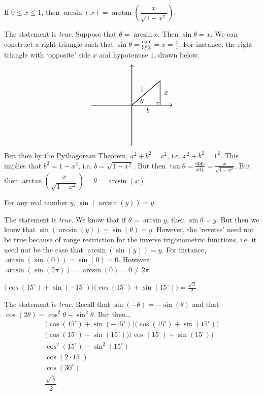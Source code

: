 \documentclass[11pt,letterpaper]{article}
\begin{document}
 If $0 \leq x \leq 1$, then $\arcsin(x)= \arctan \left( \dfrac{x}{\sqrt{1 - x^2}} \right)$. \pspace

\sol The statement is \textit{true}. Suppose that $\theta= \arcsin x$. Then $\sin \theta= x$. We can construct a right triangle such that $\sin \theta= \frac{\text{opp.}}{\text{hyp.}}= x= \frac{x}{1}$. For instance, the right triangle with `opposite' side $x$ and hypotenuse 1, drawn below. 
	\[
	\begin{tikzpicture}
	\draw[line width=0.03cm,->] (-2,0) -- (2,0);				%
	\draw[line width=0.03cm,->] (0,-2) -- (0,2);				%
	
	\node at (0.5,0.2) {$\theta$};
	\draw[line width=0.03cm] (0,0) -- (1.4,1.2) -- (1.4,0);			%
	\draw[line width=0.03cm] (1.25,0) -- (1.25,0.15) -- (1.4,0.15);	%
	
	\node at (0.8,-0.25) {$b$};
	\node at (1.7,0.6) {$x$};
	\node at (0.5,0.8) {$1$};
	\end{tikzpicture}
	\]
But then by the Pythagorean Theorem, $a^2 + b^2= c^2$, i.e. $x^2 + b^2= 1^2$. This implies that $b^2= 1 - x^2$, i.e. $b= \sqrt{1 - x^2}$. But then $\tan \theta= \frac{\text{opp.}}{\text{adj.}}= \frac{x}{\sqrt{1 - x^2}}$. But then $\arctan \left( \dfrac{x}{\sqrt{1 - x^2}} \right)= \theta= \arcsin(x)$.  \pvspace{1.3cm}



 For any real number $y$, $\sin(\arcsin(y) )= y$. \pspace

\sol The statement is \textit{true}. We know that if $\theta= \arcsin y$, then $\sin \theta= y$. But then we know that $\sin(\arcsin(y) )= \sin(\theta)= y$. However, the `reverse' need not be true because of range restriction for the inverse trigonometric functions, i.e. it need not be the case that $\arcsin(\sin(y) )= y$. For instance, $\arcsin(\sin(0) )= \sin(0)= 0$. However, $\arcsin(\sin(2\pi) )= \arcsin(0)= 0 \neq 2 \pi$. \pvspace{1.3cm}



 $\big( \cos(15^\circ) + \sin(-15^\circ) \big) \big( \cos(15^\circ) + \sin(15^\circ) \big)= \frac{\sqrt{3}}{2}$ \pspace

\sol The statement is \textit{true}. Recall that $\sin(-\theta)= -\sin(\theta)$ and that $\cos(2\theta)= \cos^2 \theta - \sin^2 \theta$. But then\dots
	\[
	\begin{gathered}
	\big( \cos(15^\circ) + \sin(-15^\circ) \big) \big( \cos(15^\circ) + \sin(15^\circ) \big) \\[0.3cm]
	\big( \cos(15^\circ) - \sin(15^\circ) \big) \big( \cos(15^\circ) + \sin(15^\circ) \big) \\[0.3cm]
	\cos^2(15^\circ) - \sin^2(15^\circ) \\[0.3cm]
	\cos(2 \cdot 15^\circ) \\[0.3cm]
	\cos(30^\circ) \\[0.3cm]
	\dfrac{\sqrt{3}}{2}
	\end{gathered}
	\] \pvspace{1.3cm}
\end{document}
